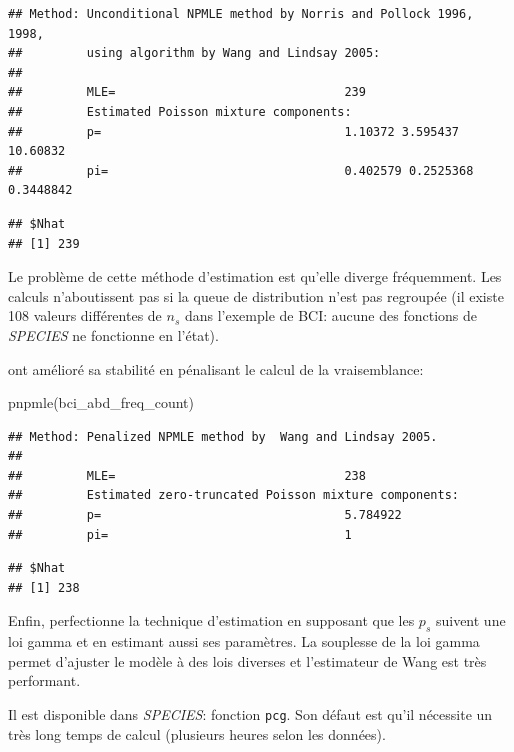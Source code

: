 \documentclass[
  11pt,
  american,
  a4paper,
  extrafontsizes,onecolumn,openright
  ]{memoir}
\newenvironment{Shaded}{\begin{snugshade}}{\end{snugshade}}
\newcommand{\FunctionTok}[1]{\textcolor[rgb]{0.00,0.00,0.00}{#1}}
\newcommand{\NormalTok}[1]{#1}
\newlength{\rf}
\begin{document}
\begin{verbatim}
## Method: Unconditional NPMLE method by Norris and Pollock 1996, 1998, 
##         using algorithm by Wang and Lindsay 2005: 
## 
##         MLE=                                239 
##         Estimated Poisson mixture components:       
##         p=                                  1.10372 3.595437 10.60832 
##         pi=                                 0.402579 0.2525368 0.3448842
\end{verbatim}

\begin{verbatim}
## $Nhat
## [1] 239
\end{verbatim}

\normalsize

Le problème de cette méthode d'estimation est qu'elle diverge fréquemment.
Les calculs n'aboutissent pas si la queue de distribution n'est pas regroupée (il existe 108 valeurs différentes de \(n_s\) dans l'exemple de BCI: aucune des fonctions de \emph{SPECIES} ne fonctionne en l'état).

\textcite{Wang2005} ont amélioré sa stabilité en pénalisant le calcul de la vraisemblance:

\scriptsize

\begin{Shaded}
\begin{Highlighting}[]
\FunctionTok{pnpmle}\NormalTok{(bci\_abd\_freq\_count)}
\end{Highlighting}
\end{Shaded}

\begin{verbatim}
## Method: Penalized NPMLE method by  Wang and Lindsay 2005. 
## 
##         MLE=                                238 
##         Estimated zero-truncated Poisson mixture components:       
##         p=                                  5.784922 
##         pi=                                 1
\end{verbatim}

\begin{verbatim}
## $Nhat
## [1] 238
\end{verbatim}

\normalsize

Enfin, \textcite{Wang2010} perfectionne la technique d'estimation en supposant que les \(p_s\) suivent une loi gamma et en estimant aussi ses paramètres.
La souplesse de la loi gamma permet d'ajuster le modèle à des lois diverses et l'estimateur de Wang est très performant.

Il est disponible dans \emph{SPECIES}: fonction \texttt{pcg}.
Son défaut est qu'il nécessite un très long temps de calcul (plusieurs heures selon les données).
\end{document}

